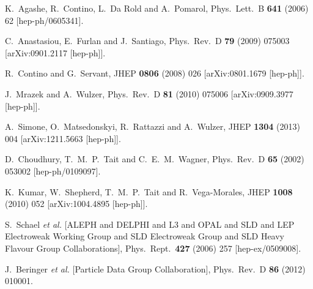 \documentclass[12pt,a4paper]{article}
\begin{document}
\begin{thebibliography}{99}
  K.~Agashe, R.~Contino, L.~Da Rold and A.~Pomarol,
  Phys.\ Lett.\ B {\bf 641} (2006) 62
  [hep-ph/0605341].



  C.~Anastasiou, E.~Furlan and J.~Santiago,
  Phys.\ Rev.\ D {\bf 79} (2009) 075003
  [arXiv:0901.2117 [hep-ph]].

  R.~Contino and G.~Servant,
  JHEP {\bf 0806} (2008) 026
  [arXiv:0801.1679 [hep-ph]].

  J.~Mrazek and A.~Wulzer,
  Phys.\ Rev.\ D {\bf 81} (2010) 075006
  [arXiv:0909.3977 [hep-ph]].

  A.~Simone, O.~Matsedonskyi, R.~Rattazzi and A.~Wulzer,
  JHEP {\bf 1304} (2013) 004
  [arXiv:1211.5663 [hep-ph]].

  D.~Choudhury, T.~M.~P.~Tait and C.~E.~M.~Wagner,
  Phys.\ Rev.\ D {\bf 65} (2002) 053002
  [hep-ph/0109097].

  K.~Kumar, W.~Shepherd, T.~M.~P.~Tait and R.~Vega-Morales,
  JHEP {\bf 1008} (2010) 052
  [arXiv:1004.4895 [hep-ph]].

  S.~Schael {\it et al.}  [ALEPH and DELPHI and L3 and OPAL and SLD and LEP Electroweak Working Group and SLD Electroweak Group and SLD Heavy Flavour Group Collaborations],
  Phys.\ Rept.\  {\bf 427} (2006) 257
  [hep-ex/0509008].

  J.~Beringer {\it et al.}  [Particle Data Group Collaboration],
  Phys.\ Rev.\ D {\bf 86} (2012) 010001.


\end{thebibliography}
\end{document}
